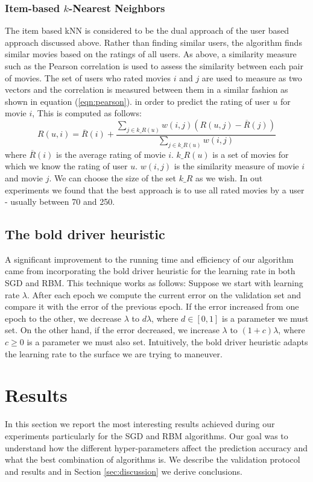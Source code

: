 \documentclass[10pt,conference,compsocconf]{IEEEtran}
\begin{document}
	\subsubsection*{\textbf{Item-based $k$-Nearest Neighbors}}  The item based kNN is considered to be the dual approach of the user based approach discussed above. Rather than finding similar users, the algorithm finds similar movies based on the ratings of all users. As above, a similarity measure such as the Pearson correlation is used to assess the similarity between each pair of movies. The set of users who rated movies $i$ and $j$ are used to measure as two vectors and the correlation is measured between them in a similar fashion as shown in equation (\ref{eqn:pearson}). in order to predict the rating of user $u$ for movie $i$, This is computed as follows:
	\begin{equation}
	R(u,i) = \overline{R}(i) + \frac{\sum_{j \in k\_R(u)} w(i,j)(R(u,j) - \overline{R}(j))}{\sum_{j \in k\_R(u)} w(i,j)}
	\end{equation}
	where $\overline{R}(i)$ is the average rating of movie $i$. $k\_R(u)$ is a set of movies for which we know the rating of user $u$. $w(i,j)$ is the similarity measure of movie $i$ and movie $j$. We can choose the size of the set $k\_R$ as we wish. In out experiments we found that the best approach is to use all rated movies by a user - usually between 70 and 250.
	
	\subsection{The bold driver heuristic} 
	A significant improvement to the running time and efficiency of our algorithm came from incorporating the bold driver heuristic for the learning rate in both SGD and RBM. This technique works as follows: Suppose we start with learning rate $\lambda$. After each epoch we compute the current error on the validation set and compare it with the error of the previous epoch. If the error increased from one epoch to the other, we decrease $\lambda$ to $d\lambda$, where $d\in[0,1]$ is a parameter we must set. On the other hand, if the error decreased, we increase $\lambda$ to $(1+c)\lambda$, where $c\geq 0$ is a parameter we must also set. Intuitively, the bold driver heuristic adapts the learning rate to the surface we are trying to maneuver.
	
	\section{Results}
	\label{sec:results}
	In this section we report the most interesting results achieved during our experiments particularly for the SGD and RBM algorithms. Our goal was to understand how the different hyper-parameters affect the prediction accuracy and what the best combination of algorithms is. We describe the validation protocol and results and in Section \ref{sec:discussion} we derive conclusions.
\end{document}
